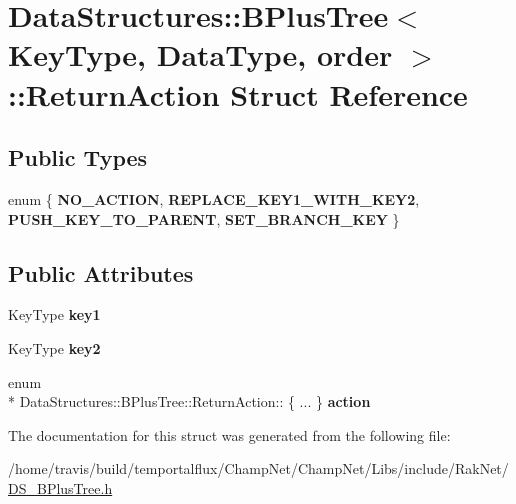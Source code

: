 \hypertarget{struct_data_structures_1_1_b_plus_tree_1_1_return_action}{\section{Data\-Structures\-:\-:B\-Plus\-Tree$<$ Key\-Type, Data\-Type, order $>$\-:\-:Return\-Action Struct Reference}
\label{struct_data_structures_1_1_b_plus_tree_1_1_return_action}
}
\subsection*{Public Types}
\begin{DoxyCompactItemize}
\item 
enum \{ {\bfseries N\-O\-\_\-\-A\-C\-T\-I\-O\-N}, 
{\bfseries R\-E\-P\-L\-A\-C\-E\-\_\-\-K\-E\-Y1\-\_\-\-W\-I\-T\-H\-\_\-\-K\-E\-Y2}, 
{\bfseries P\-U\-S\-H\-\_\-\-K\-E\-Y\-\_\-\-T\-O\-\_\-\-P\-A\-R\-E\-N\-T}, 
{\bfseries S\-E\-T\-\_\-\-B\-R\-A\-N\-C\-H\-\_\-\-K\-E\-Y}
 \}
\end{DoxyCompactItemize}
\subsection*{Public Attributes}
\begin{DoxyCompactItemize}
\item 
\hypertarget{struct_data_structures_1_1_b_plus_tree_1_1_return_action_a577102c927311ac9f5c371210bd24802}{Key\-Type {\bfseries key1}}\label{struct_data_structures_1_1_b_plus_tree_1_1_return_action_a577102c927311ac9f5c371210bd24802}

\item 
\hypertarget{struct_data_structures_1_1_b_plus_tree_1_1_return_action_a74926f4150507042a7ddc641033b6b06}{Key\-Type {\bfseries key2}}\label{struct_data_structures_1_1_b_plus_tree_1_1_return_action_a74926f4150507042a7ddc641033b6b06}

\item 
\hypertarget{struct_data_structures_1_1_b_plus_tree_1_1_return_action_a3b149085b7cf0707c55fa28fb1fa9045}{enum \\*
Data\-Structures\-::\-B\-Plus\-Tree\-::\-Return\-Action\-:: \{ ... \}  {\bfseries action}}\label{struct_data_structures_1_1_b_plus_tree_1_1_return_action_a3b149085b7cf0707c55fa28fb1fa9045}

\end{DoxyCompactItemize}


The documentation for this struct was generated from the following file\-:\begin{DoxyCompactItemize}
\item 
/home/travis/build/temportalflux/\-Champ\-Net/\-Champ\-Net/\-Libs/include/\-Rak\-Net/\hyperlink{_d_s___b_plus_tree_8h}{D\-S\-\_\-\-B\-Plus\-Tree.\-h}\end{DoxyCompactItemize}
